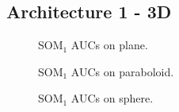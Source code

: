 \subsection{Architecture 1 - 3D}
\begin{figure}[h!]
         \centering
         
         \caption{SOM$_1$ AUCs on plane.}
\end{figure}
\begin{figure}[h!]
         \centering
         
         \caption{SOM$_1$ AUCs on paraboloid.}
\end{figure}
\begin{figure}[h!]
         \centering
         
         \caption{SOM$_1$ AUCs on sphere.}
\end{figure}
\clearpage

